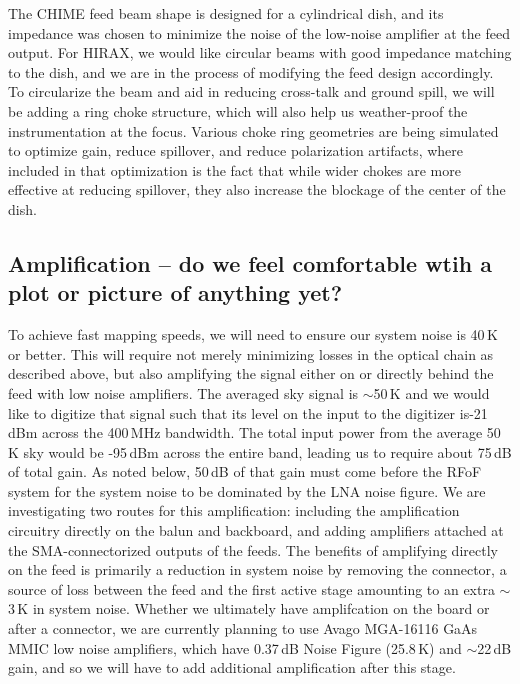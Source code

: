 \documentclass[]{spie}  %
\begin{document}
The CHIME feed beam shape is designed for a cylindrical dish, and its impedance was chosen to minimize the noise of the low-noise amplifier at the feed output. For HIRAX, we would like circular beams with good impedance matching to the dish, and we are in the process of modifying the feed design accordingly. To circularize the beam and aid in reducing cross-talk and ground spill, we will be adding a ring choke structure, which will also help us weather-proof the instrumentation at the focus. Various choke ring geometries are being simulated to optimize gain, reduce spillover, and reduce polarization artifacts, where included in that optimization is the fact that while wider chokes are more effective at reducing spillover, they also increase the blockage of the center of the dish. \newline


\subsection{Amplification -- do we feel comfortable wtih a plot or picture of anything yet?}

To achieve fast mapping speeds, we will need to ensure our system noise is 40\,K or better. This will require not merely minimizing losses in the optical chain as described above, but also amplifying the signal either on or directly behind the feed with low noise amplifiers. The averaged sky signal is $\sim$50\,K and we would like to digitize that signal such that its level on the input to the digitizer is-21\,dBm across the 400\,MHz bandwidth. The total input power from the average 50\,K sky would be -95\,dBm across the entire band, leading us to require about 75\,dB of total gain. As noted below, 50\,dB of that gain must come before the RFoF system for the system noise to be dominated by the LNA noise figure. We are investigating two routes for this amplification: including the amplification circuitry directly on the balun and backboard, and adding amplifiers attached at the SMA-connectorized outputs of the feeds. The benefits of amplifying directly on the feed is primarily a reduction in system noise by removing the connector, a source of loss between the feed and the first active stage amounting to an extra $\sim$3\,K in system noise. Whether we ultimately have amplifcation on the board or after a connector, we are currently planning to use Avago MGA-16116 GaAs MMIC low noise amplifiers, which have 0.37\,dB Noise Figure (25.8\,K) and $\sim$22\,dB gain, and so we will have to add additional amplification after this stage. \newline
\end{document}
